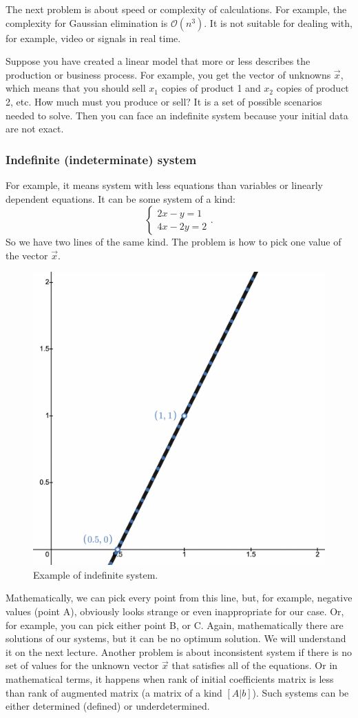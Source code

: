     \par
    The next problem is about speed or complexity of calculations. For example, the complexity for Gaussian elimination is $\mathcal{O}(n^3)$. It is not suitable for dealing with, for example, video or signals in real time.
    \par 
    Suppose you have created a linear model that more or less describes the production or business process. For example, you get the vector of unknowns $\vec{x}$, which means that you should sell $x_1$ copies of product 1 and $x_2$ copies of product 2, etc. How much must you produce or sell? It is a set of possible scenarios needed to solve. Then you can face an indefinite system because your initial data are not exact.
    \subsubsection*{Indefinite (indeterminate) system}
    For example, it means system with less equations than variables or linearly dependent equations. It can be some system of a kind:
    \[
        \left\{
            \begin{array}{l}
                2x-y=1\\
                4x-2y=2
            \end{array}.
        \right.  
    \]
    So we have two lines of the same kind. The problem is how to pick one value of the vector $\vec{x}$. 
    \begin{figure}
        \includegraphics[height=0.25\columnwidth, width=0.25\columnwidth]{lectures/images/indefinite_system.png}
        \caption*{\scriptsize{Example of indefinite system.}}
        \label{fig:indefinite_system}
    \end{figure}
    Mathematically, we can pick every point from this line, but, for example, negative values (point A), obviously looks strange or even inappropriate for our case. Or, for example, you can pick either point B, or C. Again, mathematically there are solutions of our systems, but it can be no optimum solution. We will understand it on the next lecture. Another problem is about inconsistent system if there is no set of values for the unknown vector $\vec{x}$ that satisfies all of the equations. Or in mathematical terms, it happens when rank of initial coefficients matrix is less than rank of augmented matrix (a matrix of a kind $[A|b]$). Such systems can be either determined (defined) or underdetermined.
